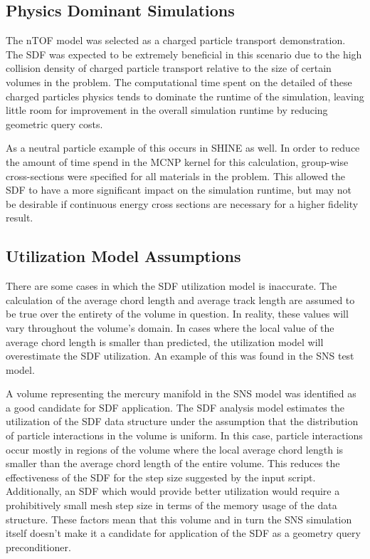 \subsection{Physics Dominant Simulations}\label{subsec:sdf_phys_dominant}

The nTOF model was selected as a charged particle transport demonstration. The
SDF was expected to be extremely beneficial in this scenario due to the high
collision density of charged particle transport relative to the size of certain
volumes in the problem. The computational time spent on the detailed of these
charged particles physics tends to dominate the runtime of the simulation,
leaving little room for improvement in the overall simulation runtime by
reducing geometric query costs.

As a neutral particle example of this occurs in SHINE as well. In order to
reduce the amount of time spend in the MCNP kernel for this calculation,
group-wise cross-sections were specified for all materials in the problem. This
allowed the SDF to have a more significant impact on the simulation runtime, but
may not be desirable if continuous energy cross sections are necessary for a
higher fidelity result.

\subsection{Utilization Model Assumptions}\label{subsec:sdf_util_model_limits}

There are some cases in which the SDF utilization model is inaccurate. The
calculation of the average chord length and average track length are assumed to
be true over the entirety of the volume in question. In reality, these values
will vary throughout the volume's domain. In cases where the local value of the
average chord length is smaller than predicted, the utilization model will overestimate
the SDF utilization. An example of this was found in the SNS test model.

A volume representing the mercury manifold in the SNS model was identified as a
good candidate for SDF application. The SDF analysis model estimates the
utilization of the SDF data structure under the assumption that the distribution
of particle interactions in the volume is uniform. In this case, particle
interactions occur mostly in regions of the volume where the local average chord
length is smaller than the average chord length of the entire volume. This
reduces the effectiveness of the SDF for the step size suggested by the input
script. Additionally, an SDF which would provide better utilization would
require a prohibitively small mesh step size in terms of the memory usage of the
data structure. These factors mean that this volume and in turn the SNS
simulation itself doesn't make it a candidate for application of the SDF as a
geometry query preconditioner.


